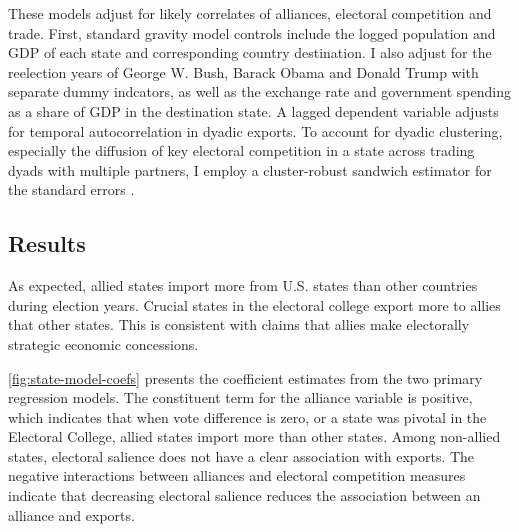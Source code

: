 \documentclass[12pt]{article}
\begin{document}
These models adjust for likely correlates of alliances, electoral competition and trade.
First, standard gravity model controls include the logged population and GDP of each state and corresponding country destination. 
I also adjust for the reelection years of George W. Bush, Barack Obama and Donald Trump with separate dummy indcators, as well as the exchange rate and government spending as a share of GDP in the destination state. 
A lagged dependent variable adjusts for temporal autocorrelation in dyadic exports.
To account for dyadic clustering, especially the diffusion of key electoral competition in a state across trading dyads with multiple partners, I employ a cluster-robust sandwich estimator for the standard errors \citep{Aronowetal2015}.



\subsection{Results}

As expected, allied states import more from U.S. states than other countries during election years. 
Crucial states in the electoral college export more to allies that other states. 
This is consistent with claims that allies make electorally strategic economic concessions. 


\autoref{fig:state-model-coefs} presents the coefficient estimates from the two primary regression models. 
The constituent term for the alliance variable is positive, which indicates that when vote difference is zero, or a state was pivotal in the Electoral College, allied states import more than other states. 
Among non-allied states, electoral salience does not have a clear association with exports. 
The negative interactions between alliances and electoral competition measures indicate that decreasing electoral salience reduces the association between an alliance and exports. 
\end{document}
